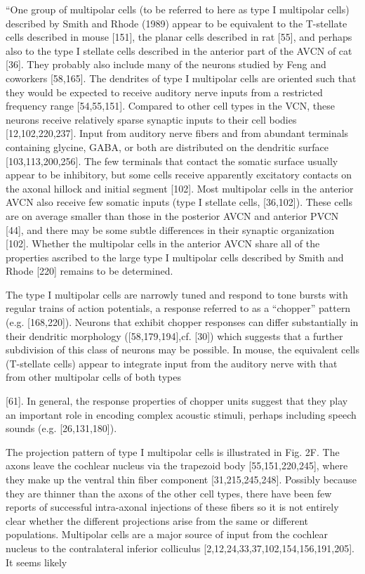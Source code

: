 \documentclass[10pt,a4paper]{article}
\begin{document}
{\textquotedblleft}One group of multipolar cells (to be referred to here as type
I multipolar cells) described by Smith and Rhode (1989) appear to be equivalent
to the T-stellate cells described in mouse [151], the planar cells described in
rat [55], and perhaps also to the type I stellate cells described in the
anterior part of the AVCN of cat [36].  They probably also include many of the
neurons studied by Feng and coworkers [58,165]. The dendrites of type I
multipolar cells are oriented such that they would be expected to receive
auditory nerve inputs from a restricted frequency range [54,55,151]. Compared to
other cell types in the VCN, these neurons receive relatively sparse synaptic
inputs to their cell bodies [12,102,220,237]. Input from auditory nerve fibers
and from abundant terminals containing glycine, GABA, or both are distributed on
the dendritic surface [103,113,200,256]. The few terminals that contact the
somatic surface usually appear to be inhibitory, but some cells receive
apparently excitatory contacts on the axonal hillock and initial segment
[102]. Most multipolar cells in the anterior AVCN also receive few somatic
inputs (type I stellate cells, [36,102]). These cells are on average smaller
than those in the posterior AVCN and anterior PVCN [44], and there may be some
subtle differences in their synaptic organization [102]. Whether the multipolar
cells in the anterior AVCN share all of the properties ascribed to the large
type I multipolar cells described by Smith and Rhode [220] remains to be
determined.

The type I multipolar cells are narrowly tuned and respond to tone bursts with
regular trains of action potentials, a response referred to as a
{\textquotedblleft}chopper{\textquotedblright} pattern (e.g.
[168,220]). Neurons that exhibit chopper responses can differ substantially in
their dendritic morphology ([58,179,194],cf. [30]) which suggests that a further
subdivision of this class of neurons may be possible. In mouse, the equivalent
cells (T-stellate cells) appear to integrate input from the auditory nerve with
that from other multipolar cells of both types

[61]. In general, the response properties of chopper units suggest that they
play an important role in encoding complex acoustic stimuli, perhaps including
speech sounds (e.g. [26,131,180]).

The projection pattern of type I multipolar cells is illustrated in Fig.
2F. The axons leave the cochlear nucleus via the trapezoid body
[55,151,220,245], where they make up the ventral thin fiber component
[31,215,245,248]. Possibly because they are thinner than the axons of the other
cell types, there have been few reports of successful intra-axonal injections of
these fibers so it is not entirely clear whether the different projections arise
from the same or different populations. Multipolar cells are a major source of
input from the cochlear nucleus to the contralateral inferior colliculus
[2,12,24,33,37,102,154,156,191,205]. It seems likely
\end{document}
